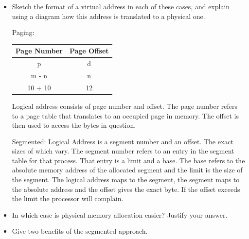 \documentclass[]{article}
\begin{document}
        \begin{itemize}
            \item Sketch the format of a virtual address in each of these cases, and explain using a diagram how this address is translated to a physical one.

            Paging:
            \begin{table}[ht]
                \centering
                \begin{tabular}{cc}\hline\hline
                Page Number & Page Offset \\\hline
                p & d \\
                m - n & n \\
                10 + 10 & 12 \\\hline\hline
                \end{tabular}
            \end{table}

            Logical address consists of page number and offset. The page number refers to a page table that translates to an occupied page in memory. The offset is then used to access the bytes in question.

            Segmented:
            Logical Address is a segment number and an offset. The exact sizes of which vary. The segment number refers to an entry in the segment table for that process. That entry is a limit and a base. The base refers to the absolute memory address of the allocated segment and the limit is the size of the segment. The logical address maps to the segment, the segment maps to the absolute address and the offset gives the exact byte. If the offset exceeds the limit the processor will complain.

            \item In which case is physical memory allocation easier? Justify your answer.
            \item Give two benefits of the segmented approach.
        \end{itemize}
\end{document}
